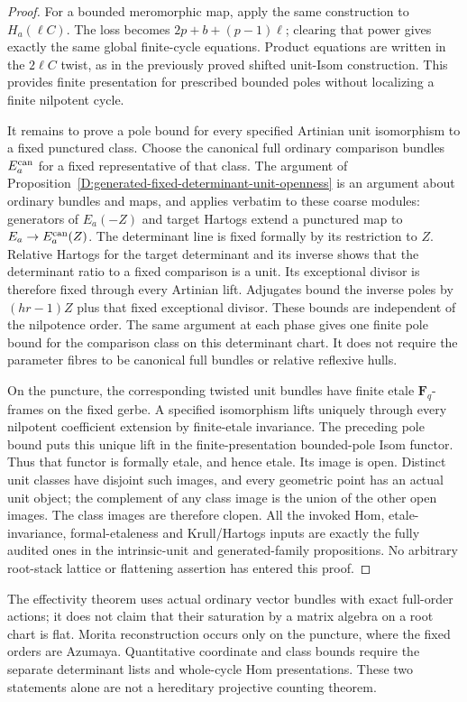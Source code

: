 \begin{proof}
For a bounded meromorphic map, apply the same construction
to $H_a(\ell C)$. The loss becomes
$2p+b+(p-1)\ell$; clearing that power gives exactly the
same global finite-cycle equations. Product equations are
written in the $2\ell C$ twist, as in the previously proved
shifted unit-Isom construction. This provides finite
presentation for prescribed bounded poles without
localizing a finite nilpotent cycle.

It remains to prove a pole bound for every specified
Artinian unit isomorphism to a fixed punctured class.
Choose the canonical full ordinary comparison bundles
$E_a^{\rm can}$ for a fixed representative of that class.
The argument of
Proposition~\ref{D:generated-fixed-determinant-unit-openness}
is an argument about ordinary bundles and maps, and
applies verbatim to these coarse modules: generators of
$E_a(-Z)$ and target Hartogs extend a punctured map to
$E_a\to E_a^{\rm can}(Z)$.
The determinant line is fixed formally by its restriction
to $Z$. Relative Hartogs for the target determinant and
its inverse shows that the determinant ratio to a fixed
comparison is a unit. Its exceptional divisor is therefore
fixed through every Artinian lift. Adjugates bound the
inverse poles by $(hr-1)Z$ plus that fixed exceptional
divisor. These bounds are independent of the nilpotence
order. The same argument at each phase gives one finite
pole bound for the comparison class on this determinant
chart. It does not require the parameter fibres to be
canonical full bundles or relative reflexive hulls.

On the puncture, the corresponding twisted unit bundles
have finite etale $\mathbf F_q$-frames on the fixed gerbe.
A specified isomorphism lifts uniquely through every
nilpotent coefficient extension by finite-etale invariance.
The preceding pole bound puts this unique lift in the
finite-presentation bounded-pole Isom functor. Thus that
functor is formally etale, and hence etale. Its image is
open. Distinct unit classes have disjoint such images,
and every geometric point has an actual unit object;
the complement of any class image is the union of the
other open images. The class images are therefore clopen.
All the invoked Hom, etale-invariance, formal-etaleness
and Krull/Hartogs inputs are exactly the fully audited
ones in the intrinsic-unit and generated-family propositions.
No arbitrary root-stack lattice or flattening assertion
has entered this proof.
\end{proof}

\begin{remark}[Scope]
The effectivity theorem uses actual ordinary vector bundles
with exact full-order actions; it does not claim that their
saturation by a matrix algebra on a root chart is flat.
Morita reconstruction occurs only on the puncture, where
the fixed orders are Azumaya. Quantitative coordinate and
class bounds require the separate determinant lists and
whole-cycle Hom presentations. These two statements alone
are not a hereditary projective counting theorem.
\end{remark}
